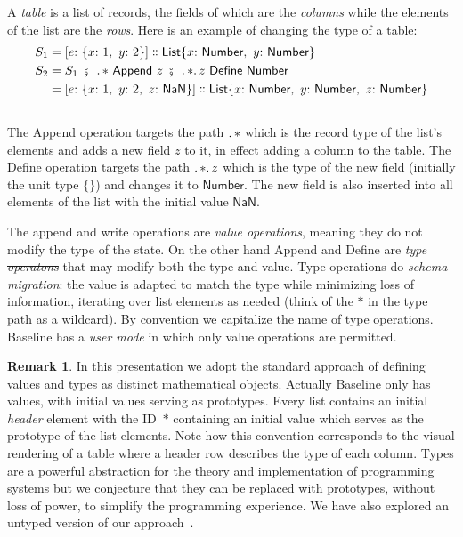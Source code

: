 \documentclass[english,submission]{programming}
\theoremstyle{definition}
\newtheorem*{remark}{Remark}
\newcommand{\mathbox}[1]{\colorbox{black!10}{$#1$\phantom{i\hspace{-3.5pt}}}}
\DeclareMathOperator{\exec}{\ \fatsemi\ \ }
\newcommand{\is}{{:}\ }
\newcommand{\comma}{,\ }
\newcommand{\isa}{\dblcolon}
\providecommand{\DIFadd}[1]{{\protect\color{blue}\uwave{#1}}} %
\providecommand{\DIFdel}[1]{{\protect\color{red}\sout{#1}}} %
\providecommand{\DIFaddbegin}{} %
\providecommand{\DIFaddend}{} %
\providecommand{\DIFdelbegin}{} %
\providecommand{\DIFdelend}{} %
\begin{document}
A \textit{table} is a list of records, the fields of which are the \textit{columns} while the elements of the list are the \textit{rows}. Here is an example of changing the type of a table:
\begin{align*}
S_1 &= [e \is \{x \is 1 \comma  y \is 2\}] \isa \textsf{List} \{x \is \textsf{Number}\comma  y \is \textsf{Number}\}\\
S_2 &= S_1 \exec \ldotp * \textsf{ Append } z \exec \ldotp * \ldotp z \textsf{ Define Number}\\
 &= [e \is \{x \is 1\comma  y \is 2,\ z\is \textsf{NaN}\}] \isa \textsf{List} \{x \is \textsf{Number}\comma  y \is \textsf{Number}\comma z\is \textsf{Number}\}\\
\end{align*}
\vspace{-30pt}\\
The \textsf{Append} operation targets the path \mathbox{\ldotp *} which is the record type of the list's elements and adds a new field \mathbox{z} to it, in effect adding a column to the table. The \textsf{Define} operation targets the path \mathbox{\ldotp  * \ldotp z} which is the type of the new field (initially the unit type \mathbox{\{\}}) and changes it to \mathbox{\textsf{Number}}. The new field is also inserted into all elements of the list with the initial value \mathbox{\textsf{NaN}}.

The \textsf{append} and \textsf{write} operations are \textit{value operations}, meaning they do not modify the type of the state. On the other hand \textsf{Append} and \textsf{Define} are \textit{type \DIFdelbegin \DIFdel{operatons}\DIFdelend \DIFaddbegin \DIFadd{operations}\DIFaddend } that may modify both the type and value. Type operations do \textit{schema migration}: the value is adapted to match the type while minimizing loss of information, iterating over list elements as needed (think of the \mathbox{*} in the type path as a wildcard). By convention we capitalize the name of type operations. Baseline has a \textit{user mode} in which only value operations are permitted.

\begin{remark}
In this presentation we adopt the standard approach of defining values and types as distinct mathematical objects. Actually Baseline only has values, with initial values serving as prototypes. Every list contains an initial \textit{header} element with the ID~\mathbox{*} containing an initial value which serves as the prototype of the list elements. Note how this convention corresponds to the visual rendering of a table where a header row describes the type of each column. Types are a powerful abstraction for the theory and implementation of programming systems but we conjecture that they can be replaced with prototypes, without loss of power, to simplify the programming experience. We have also explored an untyped version of our approach~\cite{denicek}.
\end{remark}
\end{document}
